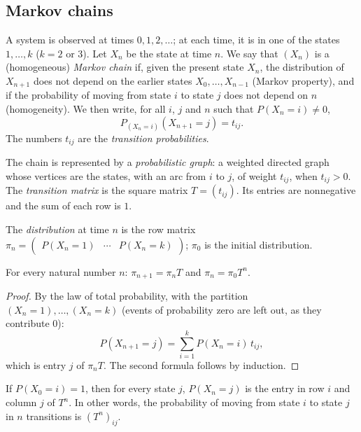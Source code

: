 \subsection{Markov chains}
\begin{definition}
A system is observed at times $0,1,2,\dots$; at each time, it is in one of the states $1,\dots,k$ ($k=2$ or $3$). Let $X_n$ be the state at time $n$. We say that $(X_n)$ is a (homogeneous) \emph{Markov chain} if, given the present state $X_n$, the distribution of $X_{n+1}$ does not depend on the earlier states $X_0,\dots,X_{n-1}$ (Markov property), and if the probability of moving from state $i$ to state $j$ does not depend on $n$ (homogeneity). We then write, for all $i$, $j$ and $n$ such that $P(X_n=i)\neq0$,
\[P_{(X_n=i)}(X_{n+1}=j)=t_{ij}.\]
The numbers $t_{ij}$ are the \emph{transition probabilities}.
\end{definition}
\begin{definition}
The chain is represented by a \emph{probabilistic graph}: a weighted directed graph whose vertices are the states, with an arc from $i$ to $j$, of weight $t_{ij}$, when $t_{ij}>0$. The \emph{transition matrix} is the square matrix $T=(t_{ij})$. Its entries are nonnegative and the sum of each row is $1$.
\end{definition}
\begin{definition}[Distribution]
The \emph{distribution} at time $n$ is the row matrix $\pi_n=\begin{pmatrix}P(X_n=1)&\cdots&P(X_n=k)\end{pmatrix}$; $\pi_0$ is the initial distribution.
\end{definition}
\begin{theorem}
For every natural number $n$: $\pi_{n+1}=\pi_nT$ and $\pi_n=\pi_0T^n$.
\end{theorem}
\begin{proof}
By the law of total probability, with the partition $\left(X_n=1\right),\dots,\left(X_n=k\right)$ (events of probability zero are left out, as they contribute $0$):
\[P(X_{n+1}=j)=\sum_{i=1}^{k}P(X_n=i)\,t_{ij},\]
which is entry $j$ of $\pi_nT$. The second formula follows by induction.
\end{proof}
\begin{theorem}
If $P(X_0=i)=1$, then for every state $j$, $P(X_n=j)$ is the entry in row $i$ and column $j$ of $T^n$. In other words, the probability of moving from state $i$ to state $j$ in $n$ transitions is $\left(T^n\right)_{ij}$.
\end{theorem}
